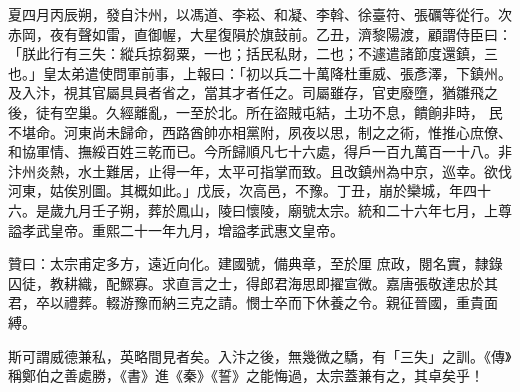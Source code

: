 \begin{pinyinscope}
 夏四月丙辰朔，發自汴州，以馮道、李崧、和凝、李斡、徐臺符、張礪等從行。次赤岡，夜有聲如雷，直御幄，大星復隕於旗鼓前。乙丑，濟黎陽渡，顧謂侍臣曰：「朕此行有三失：縱兵掠芻粟，一也；括民私財，二也；不遽遣諸節度還鎮，三也。」皇太弟遣使問軍前事，上報曰：「初以兵二十萬降杜重威、張彥澤，下鎮州。及入汴，視其官屬具員者省之，當其才者任之。司屬雖存，官吏廢墮，猶雛飛之後，徒有空巢。久經離亂，一至於北。所在盜賊屯結，土功不息，饋餉非時，
 民不堪命。河東尚未歸命，西路酋帥亦相黨附，夙夜以思，制之之術，惟推心庶僚、和協軍情、撫綏百姓三乾而已。今所歸順凡七十六處，得戶一百九萬百一十八。非汴州炎熱，水土難居，止得一年，太平可指掌而致。且改鎮州為中京，巡幸。欲伐河東，姑俟別圖。其概如此。」戊辰，次高邑，不豫。丁丑，崩於欒城，年四十六。是歲九月壬子朔，葬於鳳山，陵曰懷陵，廟號太宗。統和二十六年七月，上尊謚孝武皇帝。重熙二十一年九月，增謚孝武惠文皇帝。



 贊曰：太宗甫定多方，遠近向化。建國號，備典章，至於厘
 庶政，閱名實，隸錄囚徒，教耕織，配鰥寡。求直言之士，得郎君海思即擢宣微。嘉唐張敬達忠於其君，卒以禮葬。輟游豫而納三克之請。憫士卒而下休養之令。親征晉國，重貴面縛。



 斯可謂威德兼私，英略間見者矣。入汴之後，無幾微之驕，有「三失」之訓。《傳》稱鄭伯之善處勝，《書》進《秦》《誓》之能悔過，太宗蓋兼有之，其卓矣乎！



\end{pinyinscope}